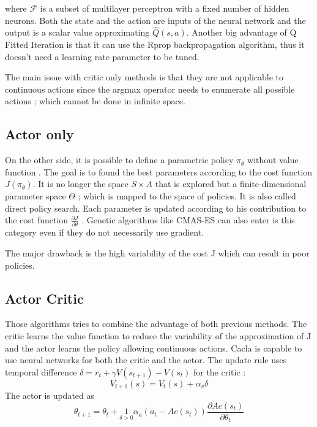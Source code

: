 
where $\mathcal{F}$ is a subset of multilayer perceptron with a fixed number of hidden neurons.
Both the state and the action are inputs of the neural network and the output is a scalar value
approximating $\hat{Q}(s,a)$. Another big advantage of Q Fitted Iteration is that it can use
the Rprop \cite{Igel2000} backpropagation algorithm, thus it doesn't need a learning rate parameter
to be tuned.

The main issue with critic only methods is that they are not applicable to continuous actions since
the argmax operator needs to enumerate all possible actions ; which cannot be done in infinite space.

\subsection{Actor only}

On the other side, it is possible to define a parametric policy $\pi_{\theta}$ without value function \cite{Sutton1999}.
The goal is to found the best parameters according to the cost function $J(\pi_{\theta})$. 
It is no longer the space $S \times A$ that is explored but a finite-dimensional parameter space $\Theta$ ;
which is mapped to the space of policies. It is also called direct policy search.
Each parameter is updated according to his contribution to the cost function 
$ \frac{\partial J}{\partial \theta} $ \cite{Kober2010a}.
Genetic algorithms like CMAS-ES \cite{Hansen2001} can also enter is this category even if 
they do not necessarily use gradient.

The major drawback is the high variability of the cost J which can result in poor policies.

\subsection{Actor Critic}

Those algorithms \cite{Konda2003} tries to combine the advantage of both previous methods.
The critic learns the value function to reduce the variability of the approximation of J 
and the actor learns the policy allowing continuous actions.
Cacla \cite{VanHasselt2007a} is capable to use neural networks for both the critic and the actor.
The update rule uses temporal difference $\delta = r_t + \gamma V(s_{t+1}) - V(s_t)$ for the critic :
\begin{equation}
 V_{t+1}(s) = V_t(s) + \alpha_v \delta
\end{equation}
The actor is updated as
\begin{equation}
 \theta_{t+1} = \theta_t + \underset{\delta > 0}{\text{1}} \alpha_a (a_t - Ac(s_t))
 \frac{\partial Ac(s_t)}{\partial \theta_t}
\end{equation}

